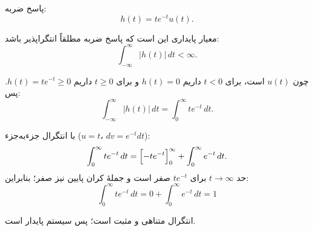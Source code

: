 پاسخ ضربه:
\[
h(t)=t e^{-t} u(t).
\]

معیار {پایداری} این است که پاسخ ضربه مطلقاً انتگرا‌پذیر باشد:
\[
\int_{-\infty}^{\infty} |h(t)|\,dt < \infty.
\]

چون \(u(t)\) است، برای \(t<0\) داریم \(h(t)=0\) و برای \(t\ge 0\) داریم \(h(t)=t e^{-t}\ge 0\). پس:
\[
\int_{-\infty}^{\infty} |h(t)|\,dt
=
\int_{0}^{\infty} t e^{-t}\,dt.
\]

با انتگرال جزء‌به‌جزء (\(u=t\)، \(dv=e^{-t}dt\)):
\[
\int_{0}^{\infty} t e^{-t}\,dt
=
\Bigl[-t e^{-t}\Bigr]_{0}^{\infty}
+
\int_{0}^{\infty} e^{-t}\,dt.
\]
حد \(t\to\infty\) برای \(t e^{-t}\) صفر است و جملهٔ کران پایین نیز صفر؛ بنابراین:
\[
\int_{0}^{\infty} t e^{-t}\,dt
=
0 + \int_{0}^{\infty} e^{-t}\,dt
=1
\]

انتگرال متناهی و مثبت است؛ پس سیستم {پایدار} است.

